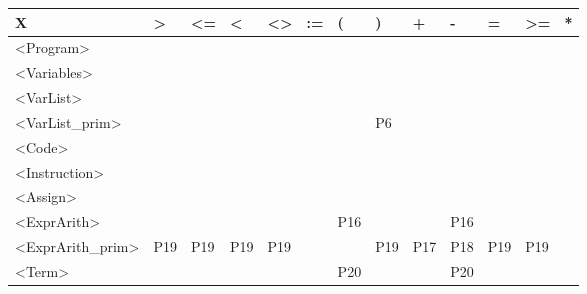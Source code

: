 \documentclass[12pt]{article}
\begin{document}
\begin{table}[H]
	\begin{tabular}{|l|l|l|l|l|l|l|l|l|l|l|l|l|}
		\hline
		X                                        & \textgreater{} & \textless{}= & \textless{} & \textless{}\textgreater{} & := & (   & )   & +   & -   & =   & \textgreater{}= & *   \\ \hline
		\textless{}Program\textgreater{}         &                &              &             &                           &    &     &     &     &     &     &                 &     \\ \hline
		\textless{}Variables\textgreater{}       &                &              &             &                           &    &     &     &     &     &     &                 &     \\ \hline
		\textless{}VarList\textgreater{}         &                &              &             &                           &    &     &     &     &     &     &                 &     \\ \hline
		\textless{}VarList\_prim\textgreater{}   &                &              &             &                           &    &     & P6  &     &     &     &                 &     \\ \hline
		\textless{}Code\textgreater{}            &                &              &             &                           &    &     &     &     &     &     &                 &     \\ \hline
		\textless{}Instruction\textgreater{}     &                &              &             &                           &    &     &     &     &     &     &                 &     \\ \hline
		\textless{}Assign\textgreater{}          &                &              &             &                           &    &     &     &     &     &     &                 &     \\ \hline
		\textless{}ExprArith\textgreater{}       &                &              &             &                           &    & P16 &     &     & P16 &     &                 &     \\ \hline
		\textless{}ExprArith\_prim\textgreater{} & P19            & P19          & P19         & P19                       &    &     & P19 & P17 & P18 & P19 & P19             &     \\ \hline
		\textless{}Term\textgreater{}            &                &              &             &                           &    & P20 &     &     & P20 &     &                 &     \\ \hline

\end{tabular}
\end{table}
\end{document}
